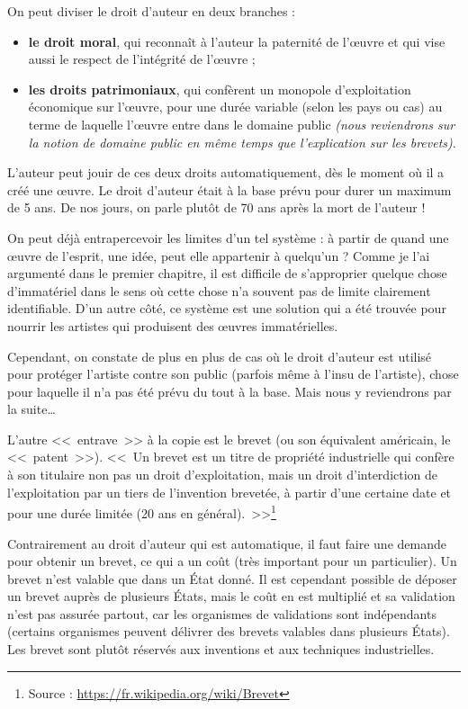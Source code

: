 On peut diviser le droit d'auteur en deux branches :
\begin{itemize}
\item \textbf{le droit moral}, qui reconnaît à l'auteur la paternité de l'œuvre et qui vise aussi le respect de l'intégrité de l'œuvre ;
\item \textbf{les droits patrimoniaux}, qui confèrent un monopole d'exploitation économique sur l'œuvre, pour une durée variable (selon les pays ou cas) au terme de laquelle l'œuvre entre dans le domaine public \textit{(nous reviendrons sur la notion de domaine public en même temps que l'explication sur les brevets)}.
\end{itemize}\bigskip

L'auteur peut jouir de ces deux droits automatiquement, dès le moment où il a créé une œuvre.
Le droit d'auteur était à la base prévu pour durer un maximum de 5 ans.
De nos jours, on parle plutôt de 70 ans après la mort de l'auteur !

On peut déjà entrapercevoir les limites d'un tel système : à partir de quand une œuvre de l'esprit, une idée, peut elle appartenir à quelqu'un ?
Comme je l'ai argumenté dans le premier chapitre, il est difficile de s'approprier quelque chose d'immatériel dans le sens où cette chose n'a souvent pas de limite clairement identifiable.
D'un autre côté, ce système est une solution qui a été trouvée pour nourrir les artistes qui produisent des œuvres immatérielles.

Cependant, on constate de plus en plus de cas où le droit d'auteur est utilisé pour protéger l'artiste contre son public (parfois même à l'insu de l'artiste), chose pour laquelle il n'a pas été prévu du tout à la base.
Mais nous y reviendrons par la suite\dots{}

L'autre <<~entrave~>> à la copie est le brevet (ou son équivalent américain, le <<~patent~>>).
<<~Un brevet est un titre de propriété industrielle qui confère à son titulaire non pas un droit d'exploitation, mais un droit d'interdiction de l'exploitation par un tiers de l'invention brevetée, à partir d'une certaine date et pour une durée limitée (20 ans en général).~>>\footnote{Source : \url{https://fr.wikipedia.org/wiki/Brevet}}

Contrairement au droit d'auteur qui est automatique, il faut faire une demande pour obtenir un brevet, ce qui a un coût (très important pour un particulier).
Un brevet n'est valable que dans un État donné.
Il est cependant possible de déposer un brevet auprès de plusieurs États, mais le coût en est multiplié et sa validation n'est pas assurée partout, car les organismes de validations sont indépendants (certains organismes peuvent délivrer des brevets valables dans plusieurs États).
Les brevet sont plutôt réservés aux inventions et aux techniques industrielles.

